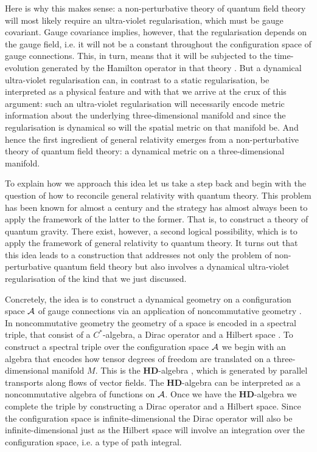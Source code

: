 \documentclass[letterpaper,12pt]{article}
\def\ca{{\cal A}}
\begin{document}
Here is why this makes sense: a non-perturbative theory of quantum field theory will most likely require an ultra-violet regularisation, which must be gauge covariant. Gauge covariance implies, however, that the regularisation depends on the gauge field, i.e. it will not be a constant throughout the configuration space of gauge connections. This, in turn, means that it will be subjected to the time-evolution generated by the Hamilton operator in that theory \cite{Aastrup:2020jcf}. But a dynamical ultra-violet regularisation can, in contrast to a static regularisation, be interpreted as a physical feature and with that we arrive at the crux of this argument: such an ultra-violet regularisation will necessarily encode metric information about the underlying three-dimensional manifold and since the regularisation is dynamical so will the spatial metric on that manifold be. And hence the first ingredient of general relativity emerges from a non-perturbative theory of quantum field theory: a dynamical metric on a three-dimensional manifold.



To explain how we approach this idea let us take a step back and begin with the question of how to reconcile general relativity with quantum theory. This problem has been known for almost a century and the strategy has almost always been to apply the framework of the latter to the former. That is, to construct a theory of quantum gravity. There exist, however, a second logical possibility, which is to apply the framework of general relativity to quantum theory. It turns out that this idea leads to a construction that addresses not only the problem of non-perturbative quantum field theory but also involves a dynamical ultra-violet regularisation of the kind that we just discussed.


Concretely, the idea is to construct a dynamical geometry on a configuration space $\ca$ of gauge connections via an application of noncommutative geometry \cite{Aastrup:2005yk}. In noncommutative geometry the geometry of a space is encoded in a spectral triple, that consist of a $C^*$-algebra, a Dirac operator and a Hilbert space \cite{Connes:2008vs,Connes:1996gi,ConnesBook}. To construct a spectral triple over the configuration space $\ca$ we begin with an algebra that encodes how tensor degrees of freedom are translated on a three-dimensional manifold $M$. This is the $\mathbf{HD}$-algebra \cite{AGnew}, which is generated by parallel transports along flows of vector fields. The $\mathbf{HD}$-algebra can be interpreted as a noncommutative algebra of functions on $\ca$.
Once we have the $\mathbf{HD}$-algebra we complete the triple by constructing a Dirac operator and a Hilbert space. Since the configuration space is infinite-dimensional the Dirac operator will also be infinite-dimensional just as the Hilbert space will involve an integration over the configuration space, i.e. a type of path integral. 
\end{document}
